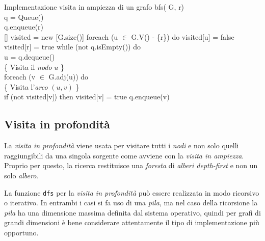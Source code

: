 \begin{code}{Implementazione visita in ampiezza di un grafo}
\noindent\rmbreak\ind bfs( G,  r)\\
     q = Queue()\\
    q.enqueue(r)\\
    [] visited = new [G.size()]\hfill{}
    foreach (u $\in$ G.V() - \{r\}) do\hfill{}
        \indf visited[u] = false\\
    \ind visited[r] = true\hfill{}
    \ind while (not q.isEmpty()) do\\
        \indf{} u = q.dequeue()\\
        \{ Visita il \emph{nodo} $u$ \}\\
        \indf foreach (v $\in$ G.adj(u)) do\\
            \indff\{ Visita l'\emph{arco} $(u,v)$ \}\\
            if (not visited[v]) then\hfill{}
                \indfff visited[v] = true\hfill{}
                q.enqueue(v)
\end{code}

\subsection{Visita in profondità}
La \emph{visita in profondità} viene usata per visitare tutti i \emph{nodi} e
non solo quelli raggiungibili da una singola sorgente come avviene con la
\emph{visita in ampiezza}. Proprio per questo, la ricerca restituisce una
\emph{foresta} di \emph{alberi depth-first} e non un solo \emph{albero}.

La funzione \texttt{dfs} per la \emph{visita in profondità} può essere realizzata
in modo ricorsivo o iterativo. In entrambi i casi si fa uso di una \emph{pila},
ma nel caso della ricorsione la \emph{pila} ha una dimensione massima definita
dal sistema operativo, quindi per grafi di grandi dimensioni è bene considerare
attentamente il tipo di implementazione più opportuno.


